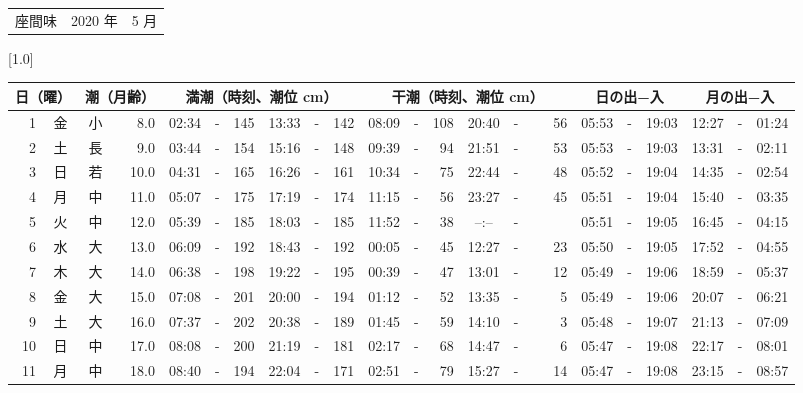 \documentclass[12pt,a4j]{jsarticle}
\begin{document}
 \begin{table}[htbp]
 \begin{center}
 \begin{tabular}{lcc}
 \LARGE{座間味}  & \large{2020 年} & \large{ 5 月} \\
 \end{tabular}
 \end{center}
 \begin{center}
    \scalebox{0.7}[1.0]{
    \begin{tabular}{|rc|cr|ccrccr|ccrccr|ccc|ccc|}
    \hline
    \multicolumn{2}{|c|}{日（曜）} & \multicolumn{2}{c|}{潮（月齢）} & \multicolumn{6}{c|}{満潮（時刻、潮位 cm）} & \multicolumn{6}{c|}{干潮（時刻、潮位 cm）} & \multicolumn{3}{c|}{日の出−入} &  \multicolumn{3}{c|}{月の出−入}\\
 \hline
 1 & 金 & 小 &  8.0 &  02:34 &-& 145 &  13:33 &-& 142 &  08:09 &-& 108 &  20:40 &-&  56 & 05:53 & -& 19:03 & 12:27 & -& 01:24 \\
 2 & 土 & 長 &  9.0 &  03:44 &-& 154 &  15:16 &-& 148 &  09:39 &-&  94 &  21:51 &-&  53 & 05:53 & -& 19:03 & 13:31 & -& 02:11 \\
 3 & 日 & 若 & 10.0 &  04:31 &-& 165 &  16:26 &-& 161 &  10:34 &-&  75 &  22:44 &-&  48 & 05:52 & -& 19:04 & 14:35 & -& 02:54 \\
 4 & 月 & 中 & 11.0 &  05:07 &-& 175 &  17:19 &-& 174 &  11:15 &-&  56 &  23:27 &-&  45 & 05:51 & -& 19:04 & 15:40 & -& 03:35 \\
 5 & 火 & 中 & 12.0 &  05:39 &-& 185 &  18:03 &-& 185 &  11:52 &-&  38 &  --:-- &-&~~~~~ & 05:51 & -& 19:05 & 16:45 & -& 04:15 \\
 6 & 水 & 大 & 13.0 &  06:09 &-& 192 &  18:43 &-& 192 &  00:05 &-&  45 &  12:27 &-&  23 & 05:50 & -& 19:05 & 17:52 & -& 04:55 \\
 7 & 木 & 大 & 14.0 &  06:38 &-& 198 &  19:22 &-& 195 &  00:39 &-&  47 &  13:01 &-&  12 & 05:49 & -& 19:06 & 18:59 & -& 05:37 \\
 8 & 金 & 大 & 15.0 &  07:08 &-& 201 &  20:00 &-& 194 &  01:12 &-&  52 &  13:35 &-&   5 & 05:49 & -& 19:06 & 20:07 & -& 06:21 \\
 9 & 土 & 大 & 16.0 &  07:37 &-& 202 &  20:38 &-& 189 &  01:45 &-&  59 &  14:10 &-&   3 & 05:48 & -& 19:07 & 21:13 & -& 07:09 \\
10 & 日 & 中 & 17.0 &  08:08 &-& 200 &  21:19 &-& 181 &  02:17 &-&  68 &  14:47 &-&   6 & 05:47 & -& 19:08 & 22:17 & -& 08:01 \\
11 & 月 & 中 & 18.0 &  08:40 &-& 194 &  22:04 &-& 171 &  02:51 &-&  79 &  15:27 &-&  14 & 05:47 & -& 19:08 & 23:15 & -& 08:57 \\

\end{tabular}}
\end{center}
\end{table}
\end{document}
